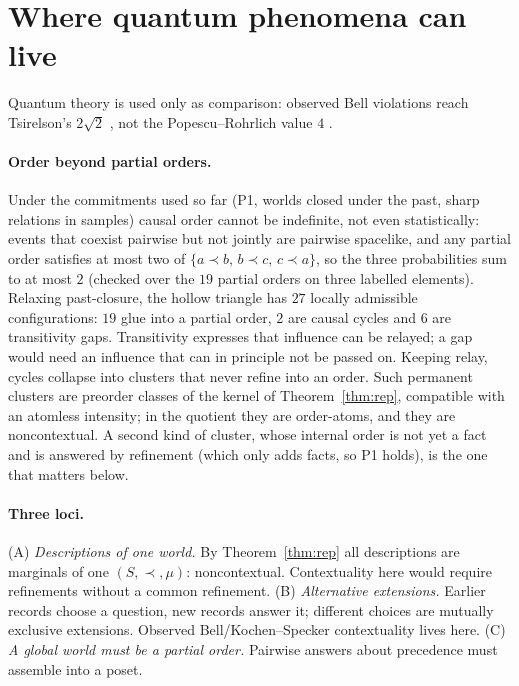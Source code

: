 \documentclass[11pt]{article}
\theoremstyle{definition}
\theoremstyle{remark}
\begin{document}
\section{Where quantum phenomena can live}\label{sec:quantum}

Quantum theory is used only as comparison: observed Bell violations reach Tsirelson's $2\sqrt2$ \cite{tsirelson}, not the Popescu--Rohrlich value $4$ \cite{pr}.

\paragraph{Order beyond partial orders.} Under the commitments used so far (P1, worlds closed under the past, sharp relations in samples) causal order cannot be indefinite, not even statistically: events that coexist pairwise but not jointly are pairwise spacelike, and any partial order satisfies at most two of $\{a\prec b,\,b\prec c,\,c\prec a\}$, so the three probabilities sum to at most $2$ (checked over the $19$ partial orders on three labelled elements). Relaxing past-closure, the hollow triangle has $27$ locally admissible configurations: $19$ glue into a partial order, $2$ are causal cycles and $6$ are transitivity gaps. Transitivity expresses that influence can be relayed; a gap would need an influence that can in principle not be passed on. Keeping relay, cycles collapse into clusters that never refine into an order. Such permanent clusters are preorder classes of the kernel of Theorem~\ref{thm:rep}, compatible with an atomless intensity; in the quotient they are order-atoms, and they are noncontextual. A second kind of cluster, whose internal order is not yet a fact and is answered by refinement (which only adds facts, so P1 holds), is the one that matters below.

\paragraph{Three loci.}
(A) \emph{Descriptions of one world.} By Theorem~\ref{thm:rep} all descriptions are marginals of one $(S,\prec,\mu)$: noncontextual. Contextuality here would require refinements without a common refinement.
(B) \emph{Alternative extensions.} Earlier records choose a question, new records answer it; different choices are mutually exclusive extensions. Observed Bell/Kochen--Specker contextuality \cite{bell,ks} lives here.
(C) \emph{A global world must be a partial order.} Pairwise answers about precedence must assemble into a poset.
\end{document}
